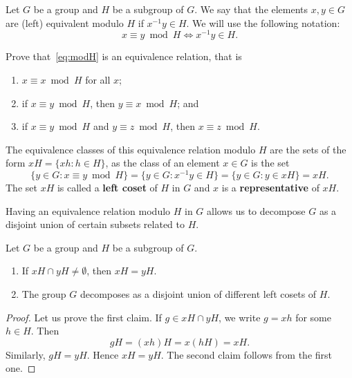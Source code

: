 \chapter{}


Let $G$ be a group and $H$ be a subgroup of $G$. We say that the elements $x,y\in
G$ are (left) equivalent modulo $H$ if $x^{-1}y\in H$.
We will use the following notation:
\begin{equation}
\label{eq:modH}
    x\equiv y\bmod
    H\Longleftrightarrow x^{-1}y\in H.
\end{equation}

\begin{exercise}
    Prove that~\eqref{eq:modH} is an equivalence relation, that
    is 
    \begin{enumerate}
    \item $x\equiv x\bmod H$ for all $x$; 
    \item if $x\equiv y\bmod H$, then $y\equiv x\bmod H$; and 
    \item if $x\equiv y\bmod H$ and $y\equiv z\bmod H$, then $x\equiv z\bmod H$.
    \end{enumerate}
\end{exercise}

The equivalence classes of this equivalence relation modulo $H$
are the sets of the form $xH=\{xh:h\in H\}$, as the class 
of an element $x\in G$ is the set 
\[
        \{y\in G:x\equiv y\bmod H\}=\{y\in G:x^{-1}y\in H\}=\{y\in G:y\in xH\}=xH.
\]
The set $xH$ is called 
a \textbf{left coset} of $H$ in $G$ and $x$ is 
a \textbf{representative} of $xH$.

Having an equivalence relation modulo $H$ in $G$ allows us to
decompose $G$ as a disjoint union of certain subsets related to $H$. 

\begin{proposition}
Let $G$ be a group and $H$ be a subgroup of $G$. 
\begin{enumerate}
\item If $xH\cap yH\ne\emptyset$, then $xH=yH$.
\item The group $G$ decomposes as a disjoint union 
of different left cosets of $H$.
\end{enumerate}
\end{proposition}

\begin{proof}
    Let us prove the first claim. If $g\in xH\cap yH$, we write 
    $g=xh$ for some $h\in H$. Then 
    \[
    gH=(xh)H=x(hH)=xH.
    \]
    Similarly, $gH=yH$. Hence $xH=yH$.
    The second claim follows from the first one. 
\end{proof}

